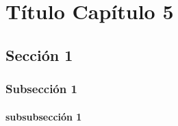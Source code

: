 \chapter{Título Capítulo 5}

\lipsum[5]

\section{Sección 1}

\lipsum[6]

\subsection{Subsección 1}

\lipsum[7]

\subsubsection{subsubsección 1}

\lipsum[8]
